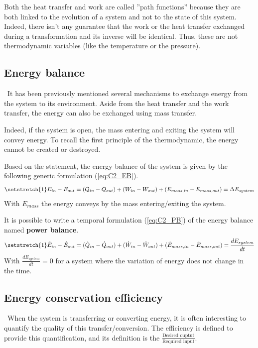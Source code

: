 Both the heat transfer and work are called ''path functions'' because they are both linked to the evolution of a system and not to the state of this system. Indeed, there isn't any guarantee that the work or the heat transfer exchanged during a transformation and its inverse will be identical.
Thus, these are not thermodynamic variables (like the temperature or the pressure).
\subsection{Energy balance}
\quad\, It has been previously mentioned several mechanisms to exchange energy from the system to its environment. Aside from the heat transfer and the work transfer, the energy can also be exchanged using mass transfer. 

Indeed, if the system is open, the mass entering and exiting the system will convey energy. To recall the first principle of the thermodynamic, the energy cannot be created or destroyed. 

Based on the statement, the energy balance of the system is given by the following generic formulation (\ref{eq:C2_EB}).
\begin{equation}
\setstretch{1}
    E_{in} - E_{out} = (Q_{in} - Q_{out}) + (W_{in} - W_{out}) + (E_{mass,in} - E_{mass,out}) = \Delta E_{system} \label{eq:C2_EB}
\end{equation}
With $E_{mass}$ the energy conveys by the mass entering/exiting the system.

It is possible to write a temporal formulation (\ref{eq:C2_PB}) of the energy balance named \textbf{power balance}.  
\begin{equation}
\setstretch{1}
    \dot{E}_{in} - \dot{E}_{out} = (\dot{Q}_{in} - \dot{Q}_{out}) + (\dot{W}_{in} - \dot{W}_{out}) + (\dot{E}_{mass,in} - \dot{E}_{mass,out}) = \frac{dE_{system}}{dt} \label{eq:C2_PB}
\end{equation}
With $\frac{dE_{system}}{dt}=0$ for a system where the variation of energy does not change in the time.
\subsection{Energy conservation efficiency}
\quad\, When the system is transferring or converting energy, it is often interesting to quantify the quality of this transfer/conversion. The efficiency is defined to provide this quantification, and its definition is the
$\frac{\text{Desired ouptut}}{\text{Required input}}$. 

